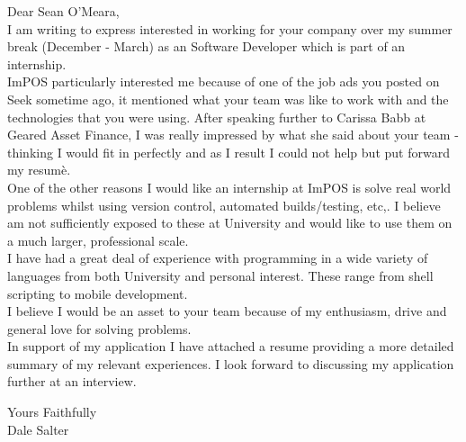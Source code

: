 \noindent Dear Sean O'Meara, \\

\noindent I am writing to express interested in working for your company over my summer break (December - March) as an Software Developer which is part of an internship. \\

\noindent ImPOS particularly interested me because of one of the job ads you posted on Seek sometime ago, it mentioned what your team was like to work with
and the technologies that you were using. After speaking further to Carissa Babb at Geared Asset Finance, I was really impressed by what she said about your team - thinking I would fit in perfectly and as I result I could not help but put forward my resumè. \\

\noindent One of the other reasons I would like an internship at ImPOS is solve real world problems whilst using version control, automated builds/testing, etc,.
I believe am not sufficiently exposed to these at University and would like to use them on a much larger, professional scale. \\

\noindent I have had a great deal of experience with programming in a wide variety of languages from both University and personal interest.
These range from shell scripting to mobile development. \\

\noindent I believe I would be an asset to your team because of my enthusiasm, drive and general love for solving problems. \\

\noindent In support of my application I have attached a resume providing a more detailed summary of my relevant experiences. I look forward to discussing my application
further at an interview.

\vspace{10 mm}

\noindent Yours Faithfully \\

\noindent Dale Salter
